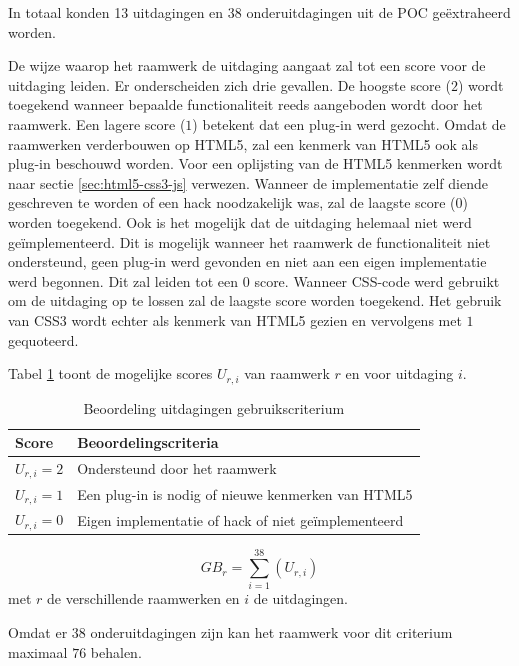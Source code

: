 In totaal konden 13 uitdagingen en 38 onderuitdagingen uit de POC geëxtraheerd worden.


De wijze waarop het raamwerk de uitdaging aangaat zal tot een score voor de uitdaging leiden.
Er onderscheiden zich drie gevallen.
De hoogste score ($2$) wordt toegekend wanneer bepaalde functionaliteit reeds aangeboden wordt door het raamwerk. 
Een lagere score ($1$) betekent dat een plug-in werd gezocht.
Omdat de raamwerken verderbouwen op HTML5, zal een kenmerk van HTML5 ook als plug-in beschouwd worden.
Voor een oplijsting van de HTML5 kenmerken wordt naar sectie \ref{sec:html5-css3-js} verwezen.
Wanneer de implementatie zelf diende geschreven te worden of een hack noodzakelijk was, zal de laagste score ($0$) worden toegekend.
Ook is het mogelijk  dat de uitdaging helemaal niet werd geïmplementeerd.
Dit is mogelijk wanneer het raamwerk de functionaliteit niet ondersteund,  geen plug-in werd gevonden en niet aan een eigen implementatie werd begonnen.
Dit zal leiden tot een $0$ score.
Wanneer CSS-code werd gebruikt om de uitdaging op te lossen zal de laagste score worden toegekend.
Het gebruik van CSS3 wordt echter als kenmerk van HTML5 gezien en vervolgens met $1$ gequoteerd.

Tabel \ref{tabel:scores-uitdagingen} toont de mogelijke scores $U_{r,i}$ van raamwerk $r$ en voor uitdaging $i$.
\begin{table}[h]	
  \centering
  \begin{tabular}{ll}
    \toprule
    \textbf{Score} & \textbf{Beoordelingscriteria}\\
    \midrule
    $U_{r,i} = 2$ & Ondersteund door het raamwerk\\
    $U_{r,i} = 1$ & Een plug-in is nodig of nieuwe kenmerken van HTML5\\
    $U_{r,i} = 0$ & Eigen implementatie of hack of niet geïmplementeerd\\ 
    \bottomrule
  \end{tabular}
  \caption{Beoordeling uitdagingen gebruikscriterium}
  \label{tabel:scores-uitdagingen}
\end{table}
\begin{equation}
  GB_r = \sum_{i=1}^{38}{\left(U_{r,i}\right)}
  \label{eq:gebruik}
\end{equation}
met $r$ de verschillende raamwerken en $i$ de uitdagingen.

Omdat er $38$ onderuitdagingen zijn kan het raamwerk voor dit criterium maximaal $76$ behalen.

